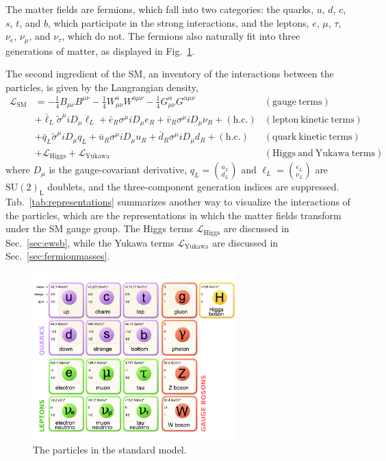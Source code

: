 The matter fields are fermions, which fall into two
categories: the quarks, $u$, $d$, $c$, $s$, $t$, and $b$, which participate in the
strong interactions, and the leptons, $e$, $\mu$, $\tau$, $\nu_e$,
$\nu_{\mu}$, and $\nu_{\tau}$, which do
not. The fermions also naturally fit into three generations of matter,
as displayed in Fig.~\ref{fig:standardmodel}. 

The second ingredient of the SM, an inventory of the interactions between the
particles, is given by the Langrangian density, 
\begin{align}
\mathcal{L}_{\mathrm{SM}} &= -\frac{1}{4}B_{\mu\nu}B^{\mu\nu} -\frac{1}{4}W^{a}_{\mu\nu}W^{a\mu\nu} - \frac{1}{4}G^{\alpha}_{\mu\nu}G^{\alpha\mu\nu}
  & \mathrm{(gauge~terms)}\nonumber\\
& +\bar\ell_L\tilde\sigma^{\mu}iD_{\mu}\ell_L +
   \bar e_R\sigma^{\mu}iD_{\mu}e_R + \bar v_R
   \sigma^{\mu}iD_{\mu}\nu_R + (\mathrm{h.c.})& \mathrm{(lepton~kinetic~terms)}\nonumber\\
& +\bar q_L\tilde\sigma^{\mu}iD_{\mu}q_L +
   \bar u_R\sigma^{\mu}iD_{\mu}u_R + \bar d_R
   \sigma^{\mu}iD_{\mu}d_R + (\mathrm{h.c.})& \mathrm{(quark~kinetic~terms)}\nonumber\\
& +\mathcal L_{\mathrm{Higgs}} +\mathcal L_{\mathrm{Yukawa}} &  \mathrm{(Higgs~and~Yukawa~terms)}
\label{eqn:lsm}
\end{align}
where $D_{\mu}$ is the gauge-covariant derivative, $q_L =
\binom{u_L}{d_L}$ and $\ell_L = \binom{e_L}{\nu_L}$ are
$\mathrm{SU(2)}_{\mathrm{L}}$ doublets, and the three-component
generation indices are suppressed.
Tab.~\ref{tab:representations} summarizes another way to visualize the
interactions of the particles, which are the representations in which the matter fields transform under the SM
gauge group. The Higgs terms $\mathcal L_{\mathrm{Higgs}}$ are discussed in
Sec.~\ref{sec:ewsb}, while the Yukawa terms $\mathcal
L_{\mathrm{Yukawa}}$ are discussed in Sec.~\ref{sec:fermionmasses}.

\begin{figure}
\centering
\includegraphics[width=0.7\textwidth]{figs/theory/standardmodel.pdf}
\caption{\label{fig:standardmodel} The particles in the standard model.}
\end{figure}

